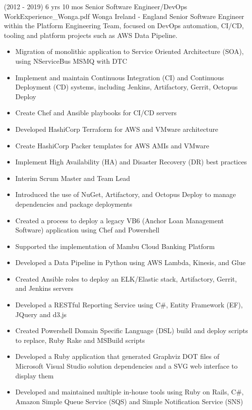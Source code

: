 \begin{twenty}
\twentyitem
  {(2012 - 2019) 6 yrs 10 mos}
  {Senior Software Engineer/DevOps}
  {WorkExperience_Wonga.pdf}
  {Wonga}
  {Ireland - England}
  {Senior Software Engineer within the Platform Engineering Team, focused on DevOps automation, CI/CD, tooling and platform projects such as AWS Data Pipeline.}
  {\begin{itemize}
    \item Migration of monolithic application to Service Oriented Architecture (SOA), using NServiceBus MSMQ with DTC
    \item Implement and maintain Continuous Integration (CI) and Continuous Deployment (CD) systems, including Jenkins, Artifactory, Gerrit, Octopus Deploy
    \item Create Chef and Ansible playbooks for CI/CD servers
    \item Developed HashiCorp Terraform for AWS and VMware architecture
    \item Create HashiCorp Packer templates for AWS AMIs and VMware
    \item Implement High Availability (HA) and Disaster Recovery (DR) best practices
    \item Interim Scrum Master and Team Lead
  \end{itemize}
  }
  {\begin{itemize}
    \item Introduced the use of NuGet, Artifactory, and Octopus Deploy to manage dependencies and package deployments
    \item Created a process to deploy a legacy VB6 (Anchor Loan Management Software) application using Chef and Powershell
    \item Supported the implementation of Mambu Cloud Banking Platform
    \item Developed a Data Pipeline in Python using AWS Lambda, Kinesis, and Glue
    \item Created Ansible roles to deploy an ELK/Elastic stack, Artifactory, Gerrit, and Jenkins servers
    \item Developed a RESTful Reporting Service using C\#, Entity Framework (EF), JQuery and d3.js
    \item Created Powershell Domain Specific Language (DSL) build and deploy scripts to replace, Ruby Rake and MSBuild scripts
    \item Developed a Ruby application that generated Graphviz DOT files of Microsoft Visual Studio solution dependencies and a SVG web interface to display them
    \item Developed and maintained multiple in-house tools using Ruby on Rails, C\#, Amazon Simple Queue Service (SQS) and Simple Notification Service (SNS)
  \end{itemize}
  }
\end{twenty}
